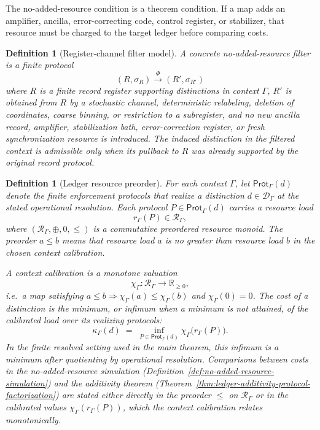 \documentclass[11pt]{article}
\newtheorem{definition}[theorem]{Definition}
\newcommand{\R}{\mathbb R}
\begin{document}
The no-added-resource condition is a theorem condition.  If a map adds an amplifier, ancilla, error-correcting code, control register, or stabilizer, that resource must be charged to the target ledger before comparing costs.


\begin{definition}[Register-channel filter model]\label{def:register-channel-no-added}
A concrete no-added-resource filter is a finite protocol
\[
 (R,\sigma_R)\xrightarrow{\Phi} (R',\sigma_{R'})
\]
where $R$ is a finite record register supporting distinctions in context $\Gamma$, $R'$ is obtained from $R$ by a stochastic channel, deterministic relabeling, deletion of coordinates, coarse binning, or restriction to a subregister, and no new ancilla record, amplifier, stabilization bath, error-correction register, or fresh synchronization resource is introduced.  The induced distinction in the filtered context is admissible only when its pullback to $R$ was already supported by the original record protocol.
\end{definition}

\begin{definition}[Ledger resource preorder]\label{def:ledger-resource-preorder}
For each context $\Gamma$, let $\mathsf{Prot}_\Gamma(d)$ denote the
finite enforcement protocols that realize a distinction
$d\in\mathcal D_\Gamma$ at the stated operational resolution.  Each
protocol $P\in\mathsf{Prot}_\Gamma(d)$ carries a resource load
\[
    r_\Gamma(P)\in\mathcal R_\Gamma,
\]
where $(\mathcal R_\Gamma,\oplus,0,\le)$ is a commutative preordered
resource monoid.  The preorder $a\le b$ means that resource load $a$
is no greater than resource load $b$ in the chosen context calibration.

A \emph{context calibration} is a monotone valuation
\[
    \chi_\Gamma:\mathcal R_\Gamma\to\R_{\ge 0},
\]
i.e.\ a map satisfying $a\le b\Rightarrow \chi_\Gamma(a)\le\chi_\Gamma(b)$
and $\chi_\Gamma(0)=0$.  The cost of a distinction is the minimum, or
infimum when a minimum is not attained, of the calibrated load over
its realizing protocols:
\[
    \kappa_\Gamma(d)
    \;=\;
    \inf_{P\in\mathsf{Prot}_\Gamma(d)} \chi_\Gamma\bigl(r_\Gamma(P)\bigr).
\]
In the finite resolved setting used in the main theorem, this infimum
is a minimum after quotienting by operational resolution.  Comparisons
between costs in the no-added-resource simulation
(Definition~\ref{def:no-added-resource-simulation}) and the additivity
theorem (Theorem~\ref{thm:ledger-additivity-protocol-factorization})
are stated either directly in the preorder $\le$ on $\mathcal R_\Gamma$
or in the calibrated values $\chi_\Gamma(r_\Gamma(P))$, which the
context calibration relates monotonically.
\end{definition}
\end{document}
